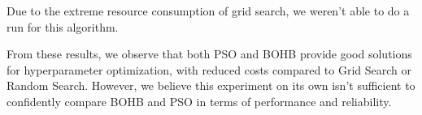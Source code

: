 \documentclass[a4 paper,11pt,2]{article}
\begin{document}
Due to the extreme resource consumption of grid search, we weren't able to do a run for this algorithm.

From these results, we observe that both PSO and BOHB provide good solutions for hyperparameter optimization, with reduced costs compared to Grid Search or Random Search. However, we believe this experiment on its own isn't sufficient to confidently compare BOHB and PSO in terms of performance and reliability.

\printbibliography
\end{document}
